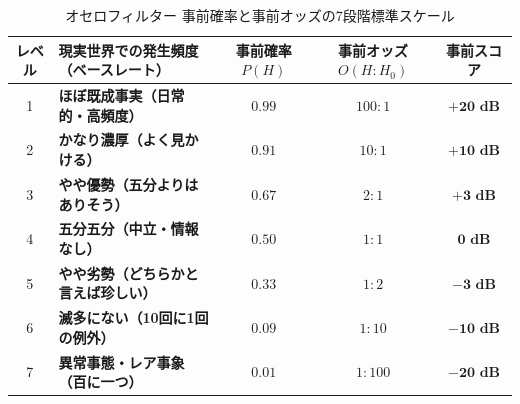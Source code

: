 \begin{table}[htbp]
  \centering
  \small

  \caption{オセロフィルター 事前確率と事前オッズの7段階標準スケール}
  \label{tab:prior_odds_scale_v2}
  \vspace{2mm}
  \begin{tabular}{clccc}
    \toprule
    レベル & 現実世界での発生頻度（ベースレート） & 事前確率 $P(H)$ & 事前オッズ $O(H : H_0)$ & 事前スコア \\
    \midrule
    1 & \textbf{ほぼ既成事実（日常的・高頻度）}   & $0.99$   & $100 : 1$                & $\mathbf{+20\text{ dB}}$ \\
    2 & \textbf{かなり濃厚（よく見かける）}       & $0.91$   & $10 : 1$                 & $\mathbf{+10\text{ dB}}$ \\
    3 & \textbf{やや優勢（五分よりはありそう）}   & $0.67$   & $2 : 1$                  & $\mathbf{+3\text{ dB}}$  \\
    4 & \textbf{五分五分（中立・情報なし）}       & $0.50$   & $1 : 1$                  & $\mathbf{0\text{ dB}}$   \\
    5 & \textbf{やや劣勢（どちらかと言えば珍しい）}& $0.33$   & $1 : 2$                  & $\mathbf{-3\text{ dB}}$  \\
    6 & \textbf{滅多にない（10回に1回の例外）}    & $0.09$   & $1 : 10$                 & $\mathbf{-10\text{ dB}}$ \\
    7 & \textbf{異常事態・レア事象（百に一つ）}   & $0.01$   & $1 : 100$                & $\mathbf{-20\text{ dB}}$ \\
    \bottomrule
  \end{tabular}

  \vspace{2.5em}


\end{table}
